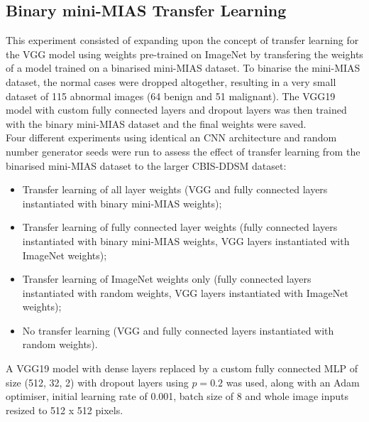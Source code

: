 
\subsection{Binary mini-MIAS Transfer Learning}

This experiment consisted of expanding upon the concept of transfer learning for the VGG model using weights pre-trained on ImageNet by transfering the weights of a model trained on a binarised mini-MIAS dataset. To binarise the mini-MIAS dataset, the normal cases were dropped altogether, resulting in a very small dataset of 115 abnormal images (64 benign and 51 malignant). The VGG19 model with custom fully connected layers and dropout layers was then trained with the binary mini-MIAS dataset and the final weights were saved.\\

Four different experiments using identical an CNN architecture and random number generator seeds were run to assess the effect of transfer learning from the binarised mini-MIAS dataset to the larger CBIS-DDSM dataset:
\begin{itemize}
    \item Transfer learning of all layer weights (VGG and fully connected layers instantiated with binary mini-MIAS weights);
    \item Transfer learning of fully connected layer weights (fully connected layers instantiated with binary mini-MIAS weights, VGG layers instantiated with ImageNet weights);
    \item Transfer learning of ImageNet weights only (fully connected layers instantiated with random weights, VGG layers instantiated with ImageNet weights);
    \item No transfer learning (VGG and fully connected layers instantiated with random weights).
\end{itemize}




A VGG19 model with dense layers replaced by a custom fully connected MLP of size (512, 32, 2) with dropout layers using $p=0.2$ was used, along with an Adam optimiser, initial learning rate of 0.001, batch size of 8 and whole image inputs resized to 512 x 512 pixels.\\

